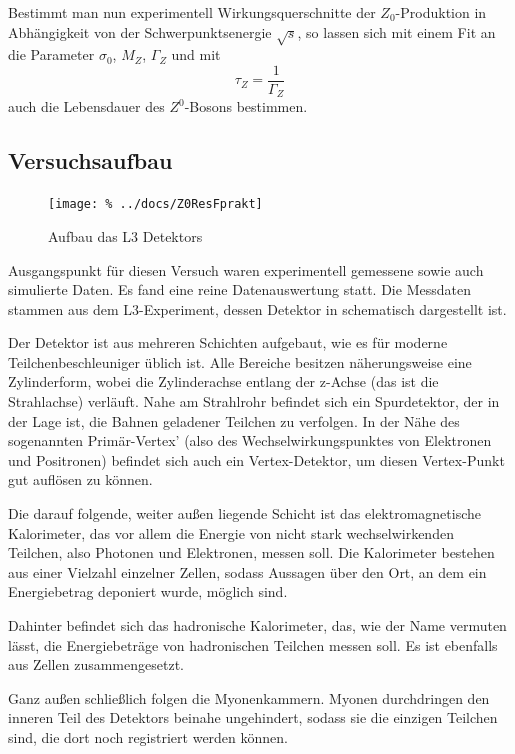 Bestimmt man nun experimentell Wirkungsquerschnitte der $Z_0$-Produktion in
Abhängigkeit von der Schwerpunktsenergie $\sqrt{s}$, so lassen sich mit einem
Fit an  die Parameter $\sigma_0$, $M_Z$, $\Gamma_Z$ und mit
\begin{equation}
  \tau_Z = \frac{1}{\Gamma_Z}
\end{equation}
auch die Lebensdauer des $Z^0$-Bosons bestimmen.


\subsection{Versuchsaufbau}

\begin{figure}[htb]
 \centering
 \texttt{[image: \%
  ../docs/Z0ResFprakt]}
 \caption{Aufbau das L3 Detektors}
 \label{fig:aufbau_detektor}
\end{figure}

Ausgangspunkt für diesen Versuch waren experimentell gemessene sowie auch
simulierte Daten. Es fand eine reine Datenauswertung statt.
Die Messdaten stammen aus dem L3-Experiment, dessen Detektor in
 schematisch dargestellt ist.

Der Detektor ist aus mehreren Schichten aufgebaut,
wie es für moderne Teilchenbeschleuniger üblich ist. Alle Bereiche besitzen näherungsweise eine Zylinderform, wobei die Zylinderachse entlang der z-Achse (das ist die Strahlachse) verläuft. Nahe am Strahlrohr befindet sich ein Spurdetektor, der in der Lage ist, die Bahnen geladener Teilchen zu verfolgen. In der Nähe des sogenannten Primär-Vertex' (also des Wechselwirkungspunktes von Elektronen und Positronen) befindet sich auch ein Vertex-Detektor, um diesen Vertex-Punkt gut auflösen zu können.

Die darauf folgende, weiter außen liegende Schicht ist das elektromagnetische Kalorimeter, das vor allem die Energie von nicht stark wechselwirkenden Teilchen, also Photonen und Elektronen, messen soll. Die Kalorimeter bestehen aus einer Vielzahl einzelner Zellen, sodass Aussagen über den Ort, an dem ein Energiebetrag deponiert wurde, möglich sind.

Dahinter befindet sich das hadronische Kalorimeter, das, wie der Name vermuten lässt, die Energiebeträge von hadronischen Teilchen messen soll. Es ist ebenfalls aus Zellen zusammengesetzt.

Ganz außen schließlich folgen die Myonenkammern. Myonen durchdringen den inneren Teil des Detektors beinahe ungehindert, sodass sie die einzigen Teilchen sind, die dort noch registriert werden können.

